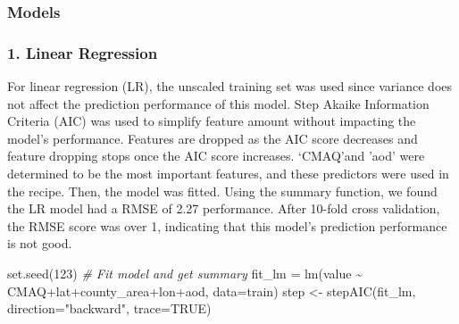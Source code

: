 \documentclass[
]{article}
\newenvironment{Shaded}{\begin{snugshade}}{\end{snugshade}}
\newcommand{\AttributeTok}[1]{\textcolor[rgb]{0.77,0.63,0.00}{#1}}
\newcommand{\CommentTok}[1]{\textcolor[rgb]{0.56,0.35,0.01}{\textit{#1}}}
\newcommand{\ConstantTok}[1]{\textcolor[rgb]{0.00,0.00,0.00}{#1}}
\newcommand{\DecValTok}[1]{\textcolor[rgb]{0.00,0.00,0.81}{#1}}
\newcommand{\FunctionTok}[1]{\textcolor[rgb]{0.00,0.00,0.00}{#1}}
\newcommand{\NormalTok}[1]{#1}
\newcommand{\OtherTok}[1]{\textcolor[rgb]{0.56,0.35,0.01}{#1}}
\newcommand{\SpecialCharTok}[1]{\textcolor[rgb]{0.00,0.00,0.00}{#1}}
\newcommand{\StringTok}[1]{\textcolor[rgb]{0.31,0.60,0.02}{#1}}
\begin{document}
\hypertarget{models}{%
\subsubsection{Models}\label{models}}

\hypertarget{linear-regression}{%
\subsubsection{1. Linear Regression}\label{linear-regression}}

For linear regression (LR), the unscaled training set was used since
variance does not affect the prediction performance of this model. Step
Akaike Information Criteria (AIC) was used to simplify feature amount
without impacting the model's performance. Features are dropped as the
AIC score decreases and feature dropping stops once the AIC score
increases. `CMAQ'and 'aod' were determined to be the most important
features, and these predictors were used in the recipe. Then, the model
was fitted. Using the summary function, we found the LR model had a RMSE
of 2.27 performance. After 10-fold cross validation, the RMSE score was
over 1, indicating that this model's prediction performance is not good.

\begin{Shaded}
\begin{Highlighting}[]
\FunctionTok{set.seed}\NormalTok{(}\DecValTok{123}\NormalTok{)}
\CommentTok{\# Fit model and get summary}
\NormalTok{fit\_lm }\OtherTok{=} \FunctionTok{lm}\NormalTok{(value }\SpecialCharTok{\textasciitilde{}}\NormalTok{ CMAQ}\SpecialCharTok{+}\NormalTok{lat}\SpecialCharTok{+}\NormalTok{county\_area}\SpecialCharTok{+}\NormalTok{lon}\SpecialCharTok{+}\NormalTok{aod, }\AttributeTok{data=}\NormalTok{train)}
\NormalTok{step }\OtherTok{\textless{}{-}} \FunctionTok{stepAIC}\NormalTok{(fit\_lm, }\AttributeTok{direction=}\StringTok{"backward"}\NormalTok{, }\AttributeTok{trace=}\ConstantTok{TRUE}\NormalTok{)}
\end{Highlighting}
\end{Shaded}
\end{document}
